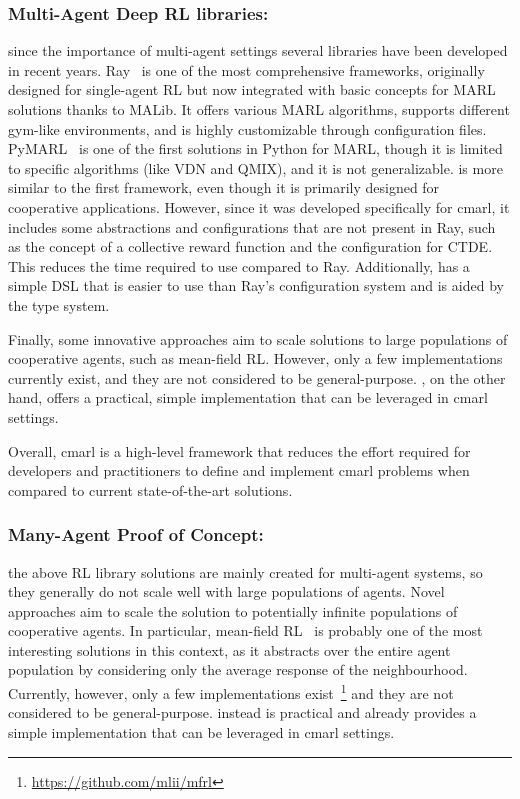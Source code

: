 \subsubsection{Multi-Agent Deep RL libraries:}
since the importance of multi-agent settings several libraries have been developed in recent years. 
Ray~\cite{ray} is one of the most comprehensive frameworks, 
 originally designed for single-agent RL but 
 now integrated with basic concepts for MARL solutions thanks to MALib. 
It offers various MARL algorithms,
 supports different gym-like environments, 
 and is highly customizable through configuration files. 
%
PyMARL~\cite{samvelyan19smac} is one of the first solutions in Python for MARL, 
 though it is limited to specific algorithms (like VDN and QMIX), 
 and it is not generalizable. 
%
\scarlib{} is more similar to the first framework, 
 even though it is primarily designed for cooperative applications. 
%
However, since it was developed specifically for \ac{cmarl}, 
 it includes some abstractions and configurations that are not present in Ray, 
 such as the concept of a collective reward function and the configuration for CTDE. 
%
This reduces the time required to use \scarlib{} compared to Ray. 
 Additionally, \scarlib{} has a simple DSL that is easier to use than Ray's configuration system and is aided by the type system.

Finally, some innovative approaches aim to scale solutions to large populations of cooperative agents, such as mean-field RL. However, only a few implementations currently exist, and they are not considered to be general-purpose. \scarlib{}, on the other hand, offers a practical, simple implementation that can be leveraged in \ac{cmarl} settings.

Overall, \ac{cmarl} is a high-level framework that reduces the effort required for developers and practitioners to define and implement \ac{cmarl} problems when compared to current state-of-the-art solutions.

\subsubsection{Many-Agent Proof of Concept:}
the above RL library solutions are mainly created for multi-agent systems, 
 so they generally do not scale well with large populations of agents. 
 Novel approaches aim to scale the solution to potentially infinite populations of cooperative agents. 
In particular, mean-field RL~\cite{meanfield} is probably one of the 
 most interesting solutions in this context, 
 as it abstracts over the entire agent population 
 by considering only the average response of the neighbourhood. 
%
Currently, however, only a few implementations 
 exist~\footnote{\url{https://github.com/mlii/mfrl}} and they are not considered to be general-purpose. 
 \scarlib{} instead is practical and already provides a simple implementation that can be leveraged in \ac{cmarl} settings. 
